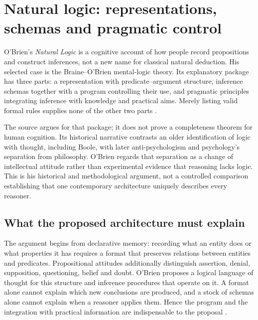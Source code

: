 \chapter{Natural logic: representations, schemas and pragmatic control}
\label{sec:p19-rationality-3-2}

O'Brien's \emph{Natural Logic} is a cognitive account of how people record
propositions and construct inferences, not a new name for classical
natural deduction. His selected case is the Braine--O'Brien mental-logic
theory. Its explanatory package has three parts: a representation with
predicate--argument structure, inference schemas together with a program
controlling their use, and pragmatic principles integrating inference
with knowledge and practical aims. Merely listing valid formal rules
supplies none of the other two parts
\cite[pp.~215--217]{OBrien2021NaturalLogic}.

The source argues for that package; it does not prove a completeness
theorem for human cognition. Its historical narrative contrasts an older
identification of logic with thought, including Boole, with later
anti-psychologism and psychology's separation from philosophy. O'Brien
regards that separation as a change of intellectual attitude rather than
experimental evidence that reasoning lacks logic. This is his historical
and methodological argument, not a controlled comparison establishing
that one contemporary architecture uniquely describes every reasoner.

\section{What the proposed architecture must explain}
\label{sec:p19-r32-architecture}

The argument begins from declarative memory: recording what an entity
does or what properties it has requires a format that preserves relations
between entities and predicates. Propositional attitudes additionally
distinguish assertion, denial, supposition, questioning, belief and doubt.
O'Brien proposes a logical language of thought for this structure and
inference procedures that operate on it. A format alone cannot explain
which new conclusions are produced, and a stock of schemas alone cannot
explain when a reasoner applies them. Hence the program and the integration
with practical information are indispensable to the proposal
\cite[pp.~215--217]{OBrien2021NaturalLogic}.

